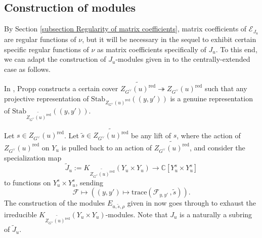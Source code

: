 \documentclass[10pt]{article}
\def\onto{\mathrel{\twoheadrightarrow}}
\newcommand{\stab}[2]{\mathrm{Stab}_{#1}(#2)}
\newcommand{\X}{\mathcal{X}}
\newcommand{\Ff}{\mathcal{F}}
\newcommand{\Ee}{\mathcal{E}}
\newcommand{\trace}[2]{\mathrm{trace}\left({#1}\,,{#2}\right)}
\newcommand{\C}{\mathbb{C}}
\newcommand{\Oo}{\mathcal{O}}
\newtheorem{lem}{Lemma}
\theoremstyle{definition}
\theoremstyle{remark}
\newcommand{\Zur}{Z_{G^\vee}(u)^{\mathrm{red}}}
\begin{document}
%
%
\subsection{Construction of modules}
\label{subsection Construction of modules}
By Section \ref{subsection Regularity of matrix coefficients}, matrix coefficients of $\Ee_{J_u}$ are regular functions of $\nu$, but it will
be necessary in the sequel to exhibit certain specific regular functions of $\nu$ as matrix coefficients 
specifically of $J_u$. To this end, we can adapt the construction of $J_u$-modules given in \cite{cellsIV} 
to the centrally-extended case as follows.

In \cite[Section 2.4]{Propp}, Propp constructs a certain cover
$\widetilde{\Zur}\onto\Zur$ such that any projective 
representation of $\stab{\Zur}{(y,y')}$ is a genuine
representation of $\stab{\widetilde{\Zur}}{(y,y')}$.

Let $s\in\Zur$.
Let $\tilde{s}\in\widetilde{\Zur}$
be any lift of $s$, where the action of $\Zur$ on $Y_u$ is pulled back to an action of 
$\widetilde{\Zur}$, and consider the specialization map 
%
\[
\tilde{J}_u:= K_{\widetilde{\Zur}}(Y_u\times Y_u)\to\C[Y_u^s\times Y_u^s]
\]
%
to functions on $Y_u^s\times Y_u^s$, sending
%
\[
\Ff\mapsto\left((y,y')\mapsto\trace{\Ff_{y,y'}}{\tilde{s}}\right).
\]
%
The construction of the modules $E_{u,\tilde{s},\rho}$ given in \cite[Section 10.3]{cellsIV} now goes through
to exhaust the irreducible $K_{\widetilde{\Zur}}(Y_u\times Y_u)$-modules. Note that $J_u$ is a naturally
a subring of $\tilde{J}_u$.
\end{document}
